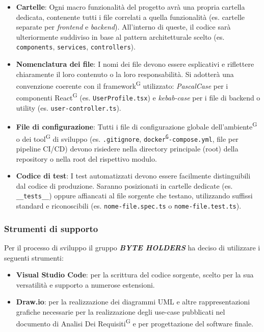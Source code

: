 \documentclass[a4paper, 11pt]{article}
\begin{document}
\begin{itemize}
    \item \textbf{Cartelle}: Ogni macro funzionalità del progetto avrà una propria cartella dedicata, contenente tutti i file correlati a quella funzionalità (es. cartelle separate per \textit{frontend} e \textit{backend}). All'interno di queste, il codice sarà ulteriormente suddiviso in base al pattern architetturale scelto (es. \texttt{components}, \texttt{services}, \texttt{controllers}).
    \item \textbf{Nomenclatura dei file}: I nomi dei file devono essere esplicativi e riflettere chiaramente il loro contenuto o la loro responsabilità. Si adotterà una convenzione coerente con il framework\textsuperscript{G} utilizzato: \textit{PascalCase} per i componenti React\textsuperscript{G} (es. \texttt{UserProfile.tsx}) e \textit{kebab-case} per i file di backend o utility (es. \texttt{user-controller.ts}).
    \item \textbf{File di configurazione}: Tutti i file di configurazione globale dell'ambiente\textsuperscript{G} o dei tool\textsuperscript{G} di sviluppo (es. \texttt{.gitignore}, \texttt{docker\textsuperscript{G}-compose.yml}, file per pipeline CI/CD) devono risiedere nella directory principale (root) della repository o nella root del rispettivo modulo.
    \item \textbf{Codice di test}: I test automatizzati devono essere facilmente distinguibili dal codice di produzione. Saranno posizionati in cartelle dedicate (es. \texttt{\_\_tests\_\_}) oppure affiancati al file sorgente che testano, utilizzando suffissi standard e riconoscibili (es. \texttt{nome-file.spec.ts} o \texttt{nome-file.test.ts}).
\end{itemize}
\subsubsection{Strumenti di supporto}
Per il processo di sviluppo il gruppo \textbf{\textit{BYTE HOLDERS}} ha deciso di utilizzare i seguenti strumenti:
\begin{itemize}
  \item \textbf{Visual Studio Code}: per la scrittura del codice sorgente, scelto per la sua versatilità e supporto a numerose estensioni.
  \item \textbf{Draw.io}: per la realizzazione dei diagrammi UML e altre rappresentazioni grafiche necessarie per la realizzazione degli use-case pubblicati nel documento di Analisi Dei Requisiti\textsuperscript{G} e per progettazione del software finale.
\end{itemize}
\end{document}
